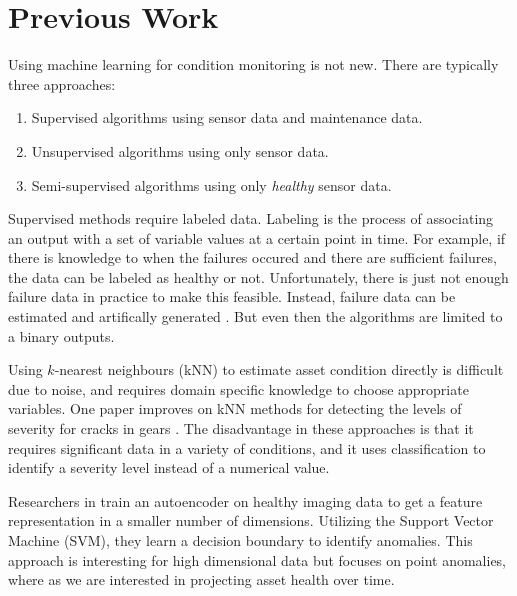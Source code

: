 \section{Previous Work}

Using machine learning for condition monitoring is not new.
There are typically three approaches:
\begin{enumerate}
	\item Supervised algorithms using sensor data and maintenance data.
    \item Unsupervised algorithms using only sensor data.
    \item Semi-supervised algorithms using only \textit{healthy} sensor data.
\end{enumerate}

Supervised methods require labeled data.
Labeling is the process of associating an output with a set of variable values at a certain point in time.
For example, if there is knowledge to when the failures occured and there are sufficient failures, the data can be labeled as healthy or not.
Unfortunately, there is just not enough failure data in practice to make this feasible.
Instead, failure data can be estimated and artifically generated \cite{Sotiris2010AnomalyDT}.
But even then the algorithms are limited to a binary outputs.

Using $k$-nearest neighbours (kNN) to estimate asset condition directly is difficult due to noise, and requires domain specific knowledge to choose appropriate variables.
One paper improves on kNN methods for detecting the levels of severity for cracks in gears \cite{lei2009gear}.
The disadvantage in these approaches is that it requires significant data in a variety of conditions, and it uses classification to identify a severity level instead of a numerical value.

Researchers in \cite{opt} train an autoencoder on healthy imaging data to get a feature representation in a smaller number of dimensions.
Utilizing the Support Vector Machine (SVM), they learn a decision boundary to identify anomalies.
This approach is interesting for high dimensional data but focuses on point anomalies, where as we are interested in projecting asset health over time.

